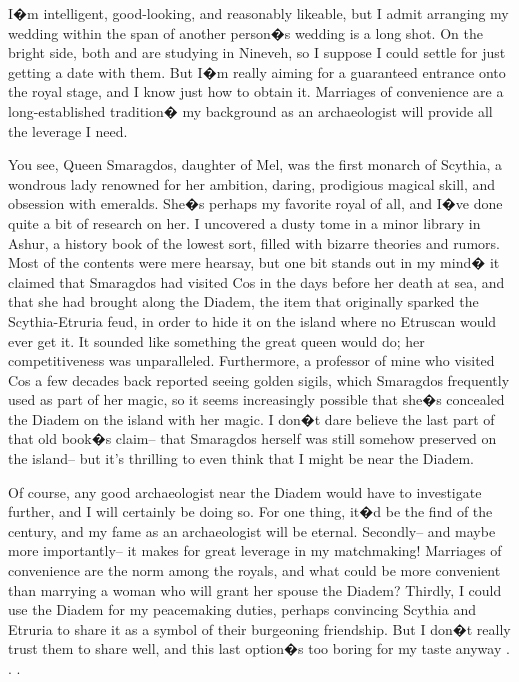\documentclass[char]{Kos}
\begin{document}
I�m intelligent, good-looking, and reasonably likeable, but I admit arranging my wedding within the span of another person�s wedding is a long shot. On the bright side, both \cPoet{\nickname} and \cWard{\nickname} are studying in Nineveh, so I suppose I could settle for just getting a date with them. But I�m really aiming for a guaranteed entrance onto the royal stage, and I know just how to obtain it. Marriages of convenience are a long-established tradition� my background as an archaeologist will provide all the leverage I need.

You see, Queen Smaragdos, daughter of Mel, was the first monarch of Scythia, a wondrous lady renowned for her ambition, daring, prodigious magical skill, and obsession with emeralds. She�s perhaps my favorite royal of all, and I�ve done quite a bit of research on her. I uncovered a dusty tome in a minor library in Ashur, a history book of the lowest sort, filled with bizarre theories and rumors. Most of the contents were mere hearsay, but one bit stands out in my mind� it claimed that Smaragdos had visited Cos in the days before her death at sea, and that she had brought along the Diadem, the item that originally sparked the Scythia-Etruria feud, in order to hide it on the island where no Etruscan would ever get it. It sounded like something the great queen would do; her competitiveness was unparalleled. Furthermore, a professor of mine who visited Cos a few decades back reported seeing golden sigils, which Smaragdos frequently used as part of her magic, so it seems increasingly possible that she�s concealed the Diadem on the island with her magic. I don�t dare believe the last part of that old book�s claim-- that Smaragdos herself was still somehow preserved on the island-- but it's thrilling to even think that I might be near the Diadem.

Of course, any good archaeologist near the Diadem would have to investigate further, and I will certainly be doing so. For one thing, it�d be the find of the century, and my fame as an archaeologist will be eternal. Secondly-- and maybe more importantly-- it makes for great leverage in my matchmaking! Marriages of convenience are the norm among the royals, and what could be more convenient than marrying a woman who will grant her spouse the Diadem? Thirdly, I could use the Diadem for my peacemaking duties, perhaps convincing Scythia and Etruria to share it as a symbol of their burgeoning friendship. But I don�t really trust them to share well, and this last option�s too boring for my taste anyway . . .
\end{document}
